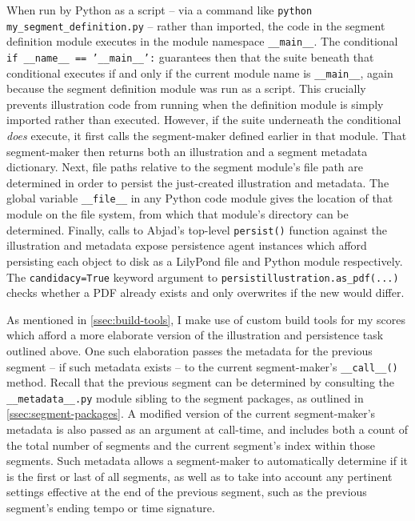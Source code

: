 \noindent When run by Python as a script -- via a command like
\texttt{python my_segment_definition.py} -- rather than imported, the
code in the segment definition module executes in the module namespace
\texttt{\_\_main\_\_}. The conditional \texttt{if __name__ ==
'__main__':} guarantees then that the suite beneath that conditional executes
if and only if the current module name is \texttt{\_\_main\_\_}, again because
the segment definition module was run as a script. This crucially prevents
illustration code from running when the definition module is simply imported
rather than executed. However, if the suite underneath the conditional
\emph{does} execute, it first calls the segment-maker defined earlier in that
module. That segment-maker then returns both an illustration and a segment
metadata dictionary. Next, file paths relative to the segment module's file
path are determined in order to persist the just-created illustration and
metadata. The global variable \texttt{\_\_file\_\_} in any Python code module
gives the location of that module on the file system, from which that module's
directory can be determined. Finally, calls to Abjad's top-level
\texttt{persist()} function against the illustration and metadata expose
persistence agent instances which afford persisting each object to disk as a
LilyPond file and Python module respectively. The \texttt{candidacy=True}
keyword argument to \texttt{persist{illustration}.as_pdf(...)}
checks whether a PDF already exists and only overwrites if the new would
differ.

As mentioned in \autoref{ssec:build-tools}, I make use of custom build tools
for my scores which afford a more elaborate version of the illustration and
persistence task outlined above. One such elaboration passes the metadata for
the previous segment -- if such metadata exists -- to the current
segment-maker's \texttt{\_\_call\_\_()} method. Recall that the previous
segment can be determined by consulting the \texttt{\_\_metadata\_\_.py} module
sibling to the segment packages, as outlined in
\autoref{ssec:segment-packages}. A modified version of the current
segment-maker's metadata is also passed as an argument at call-time, and
includes both a count of the total number of segments and the current segment's
index within those segments. Such metadata allows a segment-maker to
automatically determine if it is the first or last of all segments, as well as
to take into account any pertinent settings effective at the end of the
previous segment, such as the previous segment's ending tempo or time
signature.

